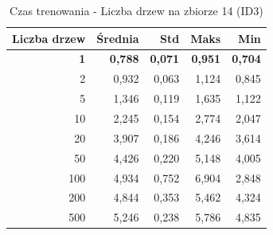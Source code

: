 \begin{table}[htbp]
\centering
\small
\setlength{\tabcolsep}{6pt}
\renewcommand{\arraystretch}{1.2}
\caption{Czas trenowania - Liczba drzew na zbiorze 14 (ID3)}
\label{tab:ID3_tree_count_14_time}
\begin{tabular}{r|r|r|r|r}
\toprule
Liczba drzew & Średnia & Std & Maks & Min \\
\hline
\textbf{1} & \textbf{0,788} & \textbf{0,071} & \textbf{0,951} & \textbf{0,704} \\
2 & 0,932 & 0,063 & 1,124 & 0,845 \\
5 & 1,346 & 0,119 & 1,635 & 1,122 \\
10 & 2,245 & 0,154 & 2,774 & 2,047 \\
20 & 3,907 & 0,186 & 4,246 & 3,614 \\
50 & 4,426 & 0,220 & 5,148 & 4,005 \\
100 & 4,934 & 0,752 & 6,904 & 2,848 \\
200 & 4,844 & 0,353 & 5,462 & 4,324 \\
500 & 5,246 & 0,238 & 5,786 & 4,835 \\
\bottomrule
\end{tabular}
\end{table}